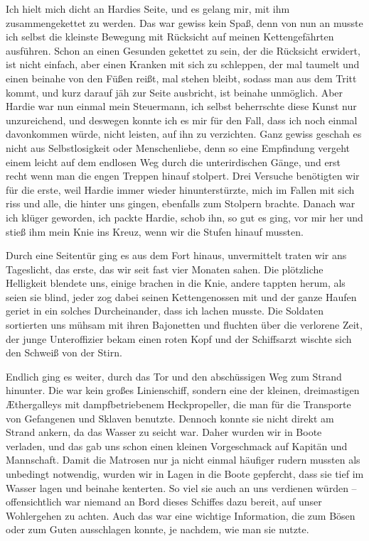 Ich hielt mich dicht an Hardies Seite, und es gelang mir, mit ihm
zusammengekettet zu werden. Das war gewiss kein Spaß, denn von nun
an musste ich selbst die kleinste Bewegung mit Rücksicht auf meinen
Kettengefährten ausführen. Schon an einen Gesunden gekettet zu
sein, der die Rücksicht erwidert, ist nicht einfach, aber einen
Kranken mit sich zu schleppen, der mal taumelt und einen beinahe
von den Füßen reißt, mal stehen bleibt, sodass man aus dem Tritt
kommt, und kurz darauf jäh zur Seite ausbricht, ist beinahe
unmöglich. Aber Hardie war nun einmal mein Steuermann, ich selbst
beherrschte diese Kunst nur unzureichend, und deswegen konnte ich
es mir für den Fall, dass ich noch einmal davonkommen würde, nicht
leisten, auf ihn zu verzichten. Ganz gewiss geschah es nicht aus
Selbstlosigkeit oder Menschenliebe, denn so eine Empfindung vergeht
einem leicht auf dem endlosen Weg durch die unterirdischen Gänge,
und erst recht wenn man die engen Treppen hinauf stolpert. Drei
Versuche benötigten wir für die erste, weil Hardie immer wieder
hinunterstürzte, mich im Fallen mit sich riss und alle, die hinter
uns gingen, ebenfalls zum Stolpern brachte. Danach war ich klüger
geworden, ich packte Hardie, schob ihn, so gut es ging, vor mir her
und stieß ihm mein Knie ins Kreuz, wenn wir die Stufen hinauf
mussten.

\bigpar

Durch eine Seitentür ging es aus dem Fort hinaus, unvermittelt
traten wir ans Tageslicht, das erste, das wir seit fast vier
Monaten sahen. Die plötzliche Helligkeit blendete uns, einige
brachen in die Knie, andere tappten herum, als seien sie blind,
jeder zog dabei seinen Kettengenossen mit und der ganze Haufen
geriet in ein solches Durcheinander, dass ich lachen musste. Die
Soldaten sortierten uns mühsam mit ihren Bajonetten und fluchten
über die verlorene Zeit, der junge Unteroffizier bekam einen roten
Kopf und der Schiffsarzt wischte sich den Schweiß von der Stirn.

Endlich ging es weiter, durch das Tor und den abschüssigen Weg zum
Strand hinunter. Die  war kein großes Linienschiff,
sondern eine der kleinen, dreimastigen Æthergalleys mit
dampfbetriebenem Heckpropeller, die man für die Transporte von
Gefangenen und Sklaven benutzte. Dennoch konnte sie nicht direkt am
Strand ankern, da das Wasser zu seicht war. Daher wurden wir in
Boote verladen, und das gab uns schon einen kleinen Vorgeschmack
auf Kapitän und Mannschaft. Damit die Matrosen nur ja nicht einmal
häufiger rudern mussten als unbedingt notwendig, wurden wir in
Lagen in die Boote gepfercht, dass sie tief im Wasser lagen und
beinahe kenterten. So viel sie auch an uns verdienen würden –
offensichtlich war niemand an Bord dieses Schiffes dazu bereit, auf
unser Wohlergehen zu achten. Auch das war eine wichtige
Information, die zum Bösen oder zum Guten ausschlagen konnte, je
nachdem, wie man sie nutzte.

